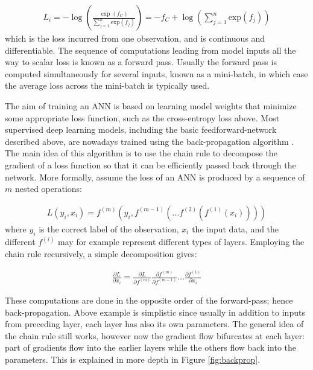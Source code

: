 \documentclass[12pt]{report}
\begin{document}
\begin{align} \label{XEloss}
  L_i  = -\log \left(\frac{\exp (f_C)}{\sum_{j=1}^{n} \text{exp}(f_j)}\right) = -f_C + \log\left(\sum_{j=1}^n \text{exp}(f_j)\right)
\end{align}
which is the loss incurred from one observation, and is continuous and differentiable. The sequence of computations leading from model inputs all the way to scalar loss is known as a forward pass. Usually the forward pass is computed simultaneously for several inputs, known as a mini-batch, in which case the average loss across the mini-batch is typically used. 

The aim of training an ANN is based on learning model weights that minimize some appropriate loss function, such as the cross-entropy loss above. Most supervised deep learning models, including the basic feedforward-network described above, are nowadays trained using the back-propagation algorithm \cite{Linnainmaa1976} \cite{Rumelhart1985}. The main idea of this algorithm is to use the chain rule to decompose the gradient of a loss function so that it can be efficiently passed back through the network. More formally, assume the loss of an ANN is produced by a sequence of $m$ nested operations:

\begin{align} \label{bp_eq1}
  L(y_i, x_i) = f^{(m)}(y_i, f^{(m-1)}(\dots f^{(2)}(f^{(1)}(x_i))))
\end{align}
where $y_i$ is the correct label of the observation, $x_i$ the input data, and the different $f^{(i)}$ may for example represent different types of layers. Employing the chain rule recursively, a simple decomposition gives:

\begin{align} \label{bp_crule}
  \frac{\partial L}{\partial x_i} = \frac{\partial L}{\partial f^{(m)}}\frac{\partial f^{(m)}}{\partial f^{(m-1)}} \dots \frac{\partial f^{(1)}}{\partial x_i}
\end{align}

These computations are done in the opposite order of the forward-pass; hence back-propagation. Above example is simplistic since usually in addition to inputs from preceding layer, each layer has also its own parameters. The general idea of the chain rule still works, however now the gradient flow bifurcates at each layer: part of gradients flow into the earlier layers while the others flow back into the parameters. This is explained in more depth in Figure \ref{fig:backprop}. 
\end{document}
